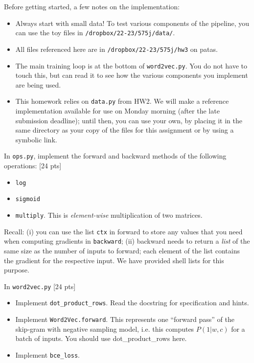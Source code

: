 \documentclass[11pt]{article}
\begin{document}
Before getting started, a few notes on the implementation:
\begin{itemize}
  \item Always start with small data!  To test various components of the pipeline, you can use the toy files in \texttt{/dropbox/22-23/575j/data/}.
  \item All files referenced here are in \texttt{/dropbox/22-23/575j/hw3} on patas.
  \item The main training loop is at the bottom of \texttt{word2vec.py}.  You do not have to touch this, but can read it to see how the various components you implement are being used.
  \item This homework relies on \texttt{data.py} from HW2. We will make a reference implementation available for use on Monday morning (after the late submission deadline); until then, you can use your own, by placing it in the same directory as your copy of the files for this assignment or by using a symbolic link.
\end{itemize}

\vspace{2em}
 In \texttt{ops.py}, implement the forward and backward methods of the following operations: [24 pts]
\begin{itemize}
  \item \texttt{log}
  \item \texttt{sigmoid}
  \item \texttt{multiply}.  This is \emph{element-wise} multiplication of two matrices.
\end{itemize}
Recall: (i) you can use the list \texttt{ctx} in forward to store any values that you need when computing gradients in \texttt{backward}; (ii) backward needs to return a \emph{list} of the same size as the number of inputs to forward; each element of the list contains the gradient for the respective input.  We have provided shell lists for this purpose.

\vspace{2em}
 In \texttt{word2vec.py} [24 pts]
\begin{itemize}
  \item Implement \texttt{dot\_product\_rows}.  Read the docstring for specification and hints.
  \item Implement \texttt{Word2Vec.forward}.  This represents one ``forward pass'' of the skip-gram with negative sampling model, i.e. this computes $P(1 | w, c)$ for a batch of inputs.  You should use dot\_product\_rows here.
  \item Implement \texttt{bce\_loss}.
\end{itemize}
\end{document}
